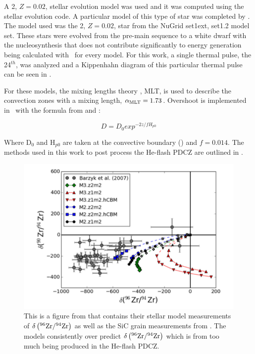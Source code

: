 \documentclass[fleqn,usenatbib]{mnras}
\begin{document}
A 2\Msun, $Z=0.02$, stellar evolution model was used and it was computed using the \MESA~\citep{mesa} stellar evolution code. A particular model of this type of star was completed by \citep{models}. The model used was the 2\Msun, $Z=0.02$, star from the NuGrid set1ext, set1.2 model set. These stars were evolved from the pre-main sequence to a white dwarf with the nucleosynthesis that does not contribute significantly to energy generation being calculated with \mppnp~for every model. For this work, a single thermal pulse, the 24$^{th}$, was analyzed and a Kippenhahn diagram of this particular thermal pulse can be seen in . 

For these models, the mixing lengths theory \citep{cox}, MLT, is used to describe the convection zones with a mixing length, $\alphaMLT=1.73$. Overshoot is implemented in \MESA~with the formula from \citet{overshoot} and \citet{freytag}:

\begin{equation}
D = D_{0} exp^{-2z/f H_{p0}}
\label{eq:overshoot}
\end{equation} 

\noindent Where D$_{0}$ and H$_{p0}$ are taken at the convective boundary () and $f=0.014$. The methods used in this work to post process the He-flash PDCZ are outlined in .

\begin{figure}
  \includegraphics[width=\columnwidth]{figs/Zr94.png}
  \caption{This is a figure from \citet{zr} that contains their stellar model measurements of $\delta\left(\zirconium[96] / \zirconium[94]\right)$ as well as the SiC grain measurements from \citet{grain}. The models consistently over predict $\delta\left(\zirconium[96] / \zirconium[94]\right)$ which is from too much \zirconium[96] being produced in the He-flash PDCZ.} 
\end{figure}
\end{document}

